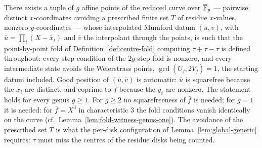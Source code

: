 \begin{lemma}
\label{lem:tau-generic}
\leanok
{}
There exists a tuple of $g$ affine points of the reduced curve over $\overline{\mathbb{F}}_p$ ---
pairwise distinct $x$-coordinates avoiding a prescribed finite set $T$ of residue
$x$-values, nonzero $y$-coordinates --- whose interpolated Mumford datum
$(\bar u, \bar v)$, with $\bar u = \prod_i (X - \bar x_i)$ and $\bar v$ the interpolant
through the points, is such that the point-by-point fold of
Definition~\ref{def:centre-fold} computing $\tau + \tau - \tau$ is defined throughout:
every step condition of the $2g$-step fold is nonzero, and every intermediate state
avoids the Weierstrass points, $\gcd(U_j, 2V_j) = 1$, the starting datum included. Good
position of $(\bar u, \bar v)$ is automatic: $\bar u$ is squarefree because the
$\bar x_i$ are distinct, and coprime to $\bar f$ because the $\bar y_i$ are nonzero. The
statement holds for every genus $g \ge 1$. For $g \ge 2$ no squarefreeness of $\bar f$
is needed; for $g = 1$ it is needed: for $\bar f = X^3$ in characteristic $3$ the fold
conditions vanish identically on the curve
(cf.\ Lemma~\ref{lem:fold-witness-genus-one}). The avoidance of the prescribed set $T$
is what the per-disk configuration of Lemma~\ref{lem:global-generic} requires: $\tau$
must miss the centres of the residue disks being counted.
\end{lemma}
